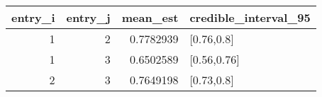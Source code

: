\begin{longtable}{rrrl}
\toprule
entry\_i & entry\_j & mean\_est & credible\_interval\_95 \\ 
\midrule
1 & 2 & 0.7782939 & [0.76,0.8] \\ 
1 & 3 & 0.6502589 & [0.56,0.76] \\ 
2 & 3 & 0.7649198 & [0.73,0.8] \\ 
\bottomrule
\end{longtable}

